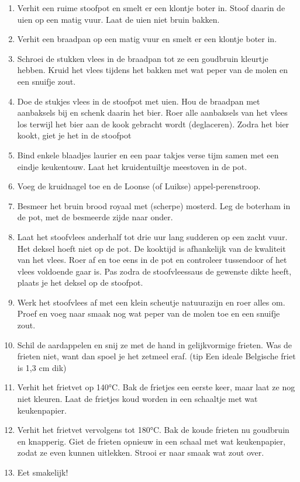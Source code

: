 \documentclass{article}
\newcommand{\preparationitem}[1]{
    \normalsize\item{#1}
}
\begin{document}
\begin{paracol}{2}
\begin{leftcolumn}
\begin{enumerate}[wide, labelwidth=!, labelindent=0pt]
        \preparationitem{Verhit een ruime stoofpot en smelt er een klontje boter in. Stoof daarin de uien op een matig vuur. Laat de uien niet bruin bakken.}
        \preparationitem{Verhit een braadpan op een matig vuur en smelt er een klontje boter in.}
        \preparationitem{Schroei de stukken vlees in de braadpan tot ze een goudbruin kleurtje hebben. Kruid het vlees tijdens het bakken met wat peper van de molen en een snuifje zout.}
        \preparationitem{Doe de stukjes vlees in de stoofpot met uien. Hou de braadpan met aanbaksels bij en schenk daarin het bier. Roer alle aanbaksels van het vlees los terwijl het bier aan de kook gebracht wordt (deglaceren). Zodra het bier kookt, giet je het in de stoofpot}
        \preparationitem{Bind enkele blaadjes laurier en een paar takjes verse tijm samen met een eindje keukentouw. Laat het kruidentuiltje meestoven in de pot.}
        \preparationitem{Voeg de kruidnagel toe en de Loonse (of Luikse) appel-perenstroop.}
        \preparationitem{Besmeer het bruin brood royaal met (scherpe) mosterd. Leg de boterham in de pot, met de besmeerde zijde naar onder.}
        \preparationitem{Laat het stoofvlees anderhalf tot drie uur lang sudderen op een zacht vuur. Het deksel hoeft niet op de pot. De kooktijd is afhankelijk van de kwaliteit van het vlees. Roer af en toe eens in de pot en controleer tussendoor of het vlees voldoende gaar is. Pas zodra de stoofvleessaus de gewenste dikte heeft, plaats je het deksel op de stoofpot.}
        \preparationitem{Werk het stoofvlees af met een klein scheutje natuurazijn en roer alles om. Proef en voeg naar smaak nog wat peper van de molen toe en een snuifje zout.}
        \preparationitem{Schil de aardappelen en snij ze met de hand in gelijkvormige frieten. Was de frieten niet, want dan spoel je het zetmeel eraf. (tip Een ideale Belgische friet is 1,3 cm dik)}
        \preparationitem{Verhit het frietvet op 140°C. Bak de frietjes een eerste keer, maar laat ze nog niet kleuren. Laat de frietjes koud worden in een schaaltje met wat keukenpapier.}
        \preparationitem{Verhit het frietvet vervolgens tot 180°C. Bak de koude frieten nu goudbruin en knapperig. Giet de frieten opnieuw in een schaal met wat keukenpapier, zodat ze even kunnen uitlekken. Strooi er naar smaak wat zout over.}
        \preparationitem{Eet smakelijk!}

\end{enumerate}
\end{leftcolumn}

\begin{rightcolumn}


\end{rightcolumn}
\end{paracol}
\end{document}
